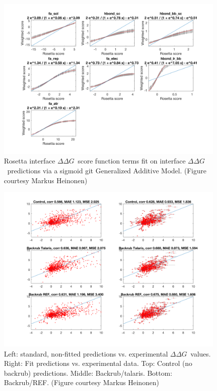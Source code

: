 \documentclass{article}
\newcommand\ddg{$\Delta\Delta G$}
\begin{document}
\begin{figure}
  \centering
  \includegraphics[width=\textwidth,keepaspectratio]{figures/zemu-sigmoid2-tal-feats.png}
  \caption[Sigmoid fit Rosetta score function terms]{
    Rosetta interface \ddg\ score function terms fit on interface \ddg\ predictions via a sigmoid git Generalized Additive Model. (Figure courtesy Markus Heinonen)
  } \label{fig:t14-fits-feats}
\end{figure}

\begin{figure}
  \centering
  \includegraphics[width=\textwidth,keepaspectratio]{figures/zemu-sigmoid2-corrs.png}
  \caption[Interface \ddg prediction performance with sigmoid fit score function]{
    Left: standard, non-fitted predictions vs. experimental \ddg\ values. Right: Fit predictions vs. experimental data. Top: Control (no backrub) predictions. Middle: Backrub/talaris. Bottom: Backrub/REF. (Figure courtesy Markus Heinonen)
  } \label{fig:t14-fit-scatter}
\end{figure}
\end{document}
